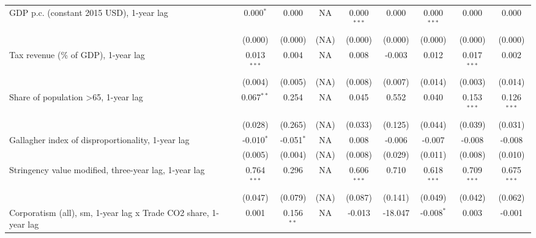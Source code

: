\begin{table}[htbp]
\begin{tabular}{lcccccccc}
      GDP p.c. (constant 2015 USD), 1-year lag                        & 0.000$^{*}$   & 0.000                     & NA           & 0.000$^{***}$  & 0.000            & 0.000$^{***}$   & 0.000           & 0.000\\   
                                                                      & (0.000)       & (0.000)                   & (NA)         & (0.000)        & (0.000)          & (0.000)         & (0.000)         & (0.000)\\   
      Tax revenue (\% of GDP), 1-year lag                             & 0.013$^{***}$ & 0.004                     & NA           & 0.008          & -0.003           & 0.012           & 0.017$^{***}$   & 0.002\\   
                                                                      & (0.004)       & (0.005)                   & (NA)         & (0.008)        & (0.007)          & (0.014)         & (0.003)         & (0.014)\\   
      Share of population >65, 1-year lag                             & 0.067$^{**}$  & 0.254                     & NA           & 0.045          & 0.552            & 0.040           & 0.153$^{***}$   & 0.126$^{***}$\\   
                                                                      & (0.028)       & (0.265)                   & (NA)         & (0.033)        & (0.125)          & (0.044)         & (0.039)         & (0.031)\\   
      Gallagher index of disproportionality, 1-year lag               & -0.010$^{*}$  & -0.051$^{*}$              & NA           & 0.008          & -0.006           & -0.007          & -0.008          & -0.008\\   
                                                                      & (0.005)       & (0.004)                   & (NA)         & (0.008)        & (0.029)          & (0.011)         & (0.008)         & (0.010)\\   
      Stringency value modified, three-year lag, 1-year lag           & 0.764$^{***}$ & 0.296                     & NA           & 0.606$^{***}$  & 0.710            & 0.618$^{***}$   & 0.709$^{***}$   & 0.675$^{***}$\\   
                                                                      & (0.047)       & (0.079)                   & (NA)         & (0.087)        & (0.141)          & (0.049)         & (0.042)         & (0.062)\\   
      Corporatism (all), sm, 1-year lag x Trade CO2 share, 1-year lag & 0.001         & 0.156$^{**}$              & NA           & -0.013         & -18.047          & -0.008$^{*}$    & 0.003           & -0.001\\   

\end{tabular}
\end{table}
